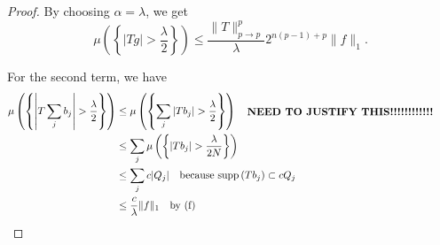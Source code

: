 \documentclass[a4paper]{article}
\newcommand{\supp}[1]{\mathop{\mathrm{supp}}\left(#1\right)}
\begin{document}
\begin{enumerate}
\begin{proof}
    By choosing $\alpha = \lambda$, we get
    \[ \mu \left( \left\{ |Tg| > \frac{\lambda}{2} \right\} \right) \leq \frac{\|T\|_{p \to p}^p}{\lambda} 2^{n(p-1) + p} \|f\|_1 .\]

    For the second term, we have
    \begin{align*}
      \mu \left( \left\{ \left| T \sum_j b_j \right| > \frac{\lambda}{2} \right\} \right) &\leq \mu \left( \left\{ \sum_j | T b_j | >
        \frac{\lambda}{2} \right\} \right) \quad \parbox{7cm}{\textbf{NEED TO JUSTIFY THIS!!!!!!!!!!!!}} \\
      &\leq \sum_j \mu \left( \left\{ |T b_j | > \frac{\lambda}{2N} \right\} \right) \\
      &\leq \sum_j c |Q_j| \quad \parbox{5cm}{because $\supp{Tb_j} \subset c Q_j$} \\
      &\leq \frac{c}{\lambda} \|f\|_1 \quad \parbox{5cm}{by (f)}
    \end{align*}

  \end{proof}

\end{enumerate}
\end{document}
